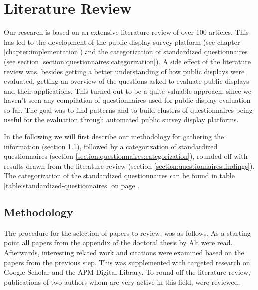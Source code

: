 \section{Literature Review}
\label{chapter:literature-review}

	Our research is based on an extensive literature review of over 100 articles. This has led to the development of the public display survey platform (see chapter \ref{chapter:implementation}) and the categorization of standardized questionnaires (see section \ref{section:questionnaires:categorization}). A side effect of the literature review was, besides getting a better understanding of how public displays were evaluated, getting an overview of the questions asked to evaluate public displays and their applications. This turned out to be a quite valuable approach, since we haven't seen any compilation of questionnaires used for public display evaluation so far. The goal was to find patterns and to build clusters of questionnaires being useful for the evaluation through automated public survey display platforms.

	In the following we will first describe our methodology for gathering the information (section \ref{section:questionnaires:methodology}), followed by a categorization of standardized questionnaires (section \ref{section:questionnaires:categorization}), rounded off with results drawn from the literature review (section \ref{section:questionnaires:findings}). The categorization of the standardized questionnaires can be found in table \ref{table:standardized-questionnaires} on page \pageref{table:standardized-questionnaires}.



\subsection{Methodology}
\label{section:questionnaires:methodology}

	The procedure for the selection of papers to review, was as follows. As a starting point all papers from the appendix of the doctoral thesis by Alt \cite{alt2013thesis} were read. Afterwards, interesting related work and citations were examined based on the papers from the previous step. This was supplemented with targeted research on Google Scholar and the APM Digital Library. To round off the literature review, publications of two authors whom are very active in this field, were reviewed. 

